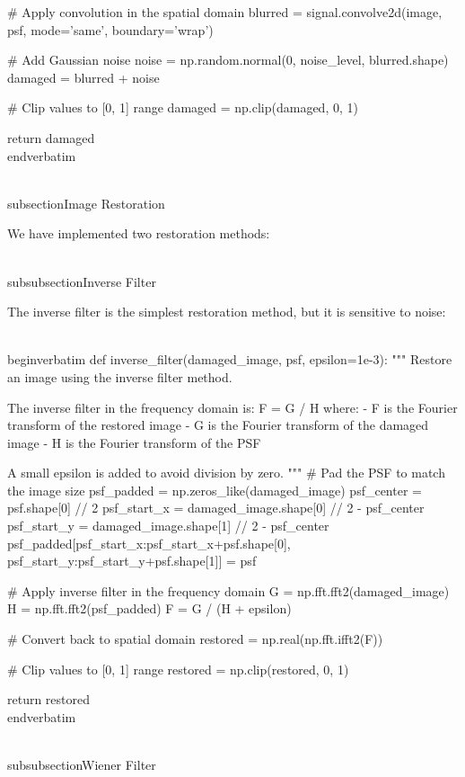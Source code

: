     # Apply convolution in the spatial domain
    blurred = signal.convolve2d(image, psf, mode='same', boundary='wrap')
    
    # Add Gaussian noise
    noise = np.random.normal(0, noise_level, blurred.shape)
    damaged = blurred + noise
    
    # Clip values to [0, 1] range
    damaged = np.clip(damaged, 0, 1)
    
    return damaged
\\end{verbatim}

\\subsection{Image Restoration}

We have implemented two restoration methods:

\\subsubsection{Inverse Filter}

The inverse filter is the simplest restoration method, but it is sensitive to noise:

\\begin{verbatim}
def inverse_filter(damaged_image, psf, epsilon=1e-3):
    """
    Restore an image using the inverse filter method.
    
    The inverse filter in the frequency domain is: F = G / H
    where:
    - F is the Fourier transform of the restored image
    - G is the Fourier transform of the damaged image
    - H is the Fourier transform of the PSF
    
    A small epsilon is added to avoid division by zero.
    """
    # Pad the PSF to match the image size
    psf_padded = np.zeros_like(damaged_image)
    psf_center = psf.shape[0] // 2
    psf_start_x = damaged_image.shape[0] // 2 - psf_center
    psf_start_y = damaged_image.shape[1] // 2 - psf_center
    psf_padded[psf_start_x:psf_start_x+psf.shape[0], 
               psf_start_y:psf_start_y+psf.shape[1]] = psf
    
    # Apply inverse filter in the frequency domain
    G = np.fft.fft2(damaged_image)
    H = np.fft.fft2(psf_padded)
    F = G / (H + epsilon)
    
    # Convert back to spatial domain
    restored = np.real(np.fft.ifft2(F))
    
    # Clip values to [0, 1] range
    restored = np.clip(restored, 0, 1)
    
    return restored
\\end{verbatim}

\\subsubsection{Wiener Filter}

